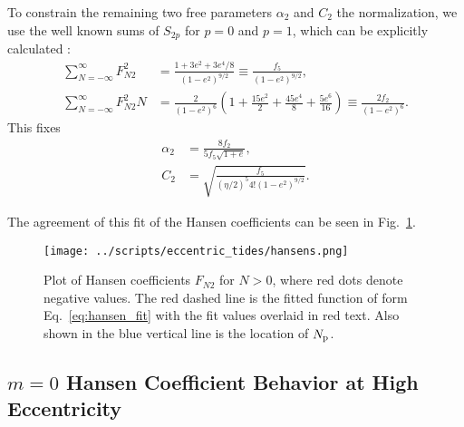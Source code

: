 \documentclass[
        fleqn,
        usenatbib,
        referee,
    ]{mnras}
\newcommand*{\p}[1]{\left(#1\right)}
\begin{document}
To constrain the remaining two free parameters $\alpha_{2}$ and $C_2$ the
normalization, we use the well known sums of $S_{2p}$ for $p = 0$ and $p = 1$,
which can be explicitly calculated \citep{hut,sl,vlf}:
\begin{align}
    \sum\limits_{N = -\infty}^\infty F_{N2}^2
        &= \frac{1 + 3e^2 + 3e^4/8}{\p{1 - e^2}^{9/2}}
            \equiv \frac{f_5}{\p{1 - e^2}^{9/2}},\\
    \sum\limits_{N = -\infty}^\infty F_{N2}^2N
        &= \frac{2}{\p{1 - e^2}^6}\p{1 + \frac{15e^2}{2}
            + \frac{45 e^4}{8} + \frac{5e^6}{16}}
        \equiv \frac{2f_2}{\p{1 - e^2}^6}.\label{eq:f2}
\end{align}
This fixes
\begin{align}
    \alpha_{2} &= \frac{8f_2}{5f_5\sqrt{1 + e}},\\
    C_2 &= \sqrt{\frac{f_5}{\p{\eta/2}^5 4! \p{1 - e^2}^{9/2}}}.
\end{align}

The agreement of this fit of the Hansen coefficients can be seen in
Fig.~\ref{fig:hansens}.
\begin{figure}
    \centering
    \texttt{[image: ../scripts/eccentric\_tides/hansens.png]}
    \caption{Plot of Hansen coefficients $F_{N2}$ for $N > 0$, where red dots
    denote negative values. The red dashed line is the fitted function of form
    Eq.~\eqref{eq:hansen_fit} with the fit values overlaid in red text. Also shown
    in the blue vertical line is the location of $N_{\rm
    p}$.}\label{fig:hansens}
\end{figure}

\subsection{$m = 0$ Hansen Coefficient Behavior at High Eccentricity}
\end{document}
